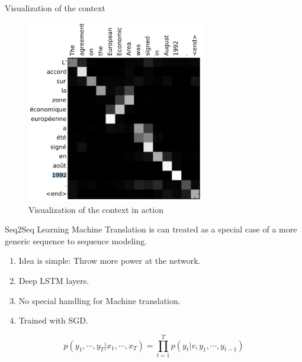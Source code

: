 ﻿\documentclass[aspectratio=43,mathserif,xcolor={usenames,dvipsnames,svgnames,table},10pt]{beamer}
\begin{document}
\begin{frame}{Visualization of the context}
 \begin{figure}[h]
    \includegraphics[height=8cm]{images/contextres.png}  
    \caption{Visualization of the context in action}
  \end{figure}
\end{frame}

\begin{frame}{Seq2Seq Learning}
 Machine Translation is can treated as a special case of a more generic sequence to sequence modeling.
 \begin{enumerate}
  \item Idea is simple: Throw more power at the network.
  \item Deep LSTM layers.
  \item No special handling for Machine translation.
  \item Trained with SGD.
 \end{enumerate}
$$ p(y_1, \cdots, y_T| x_1, \cdots, x_T) = \prod_{t=1}^{T} p(y_t| v, y_1, \cdots, y_{t-1})$$
\end{frame}
\end{document}
